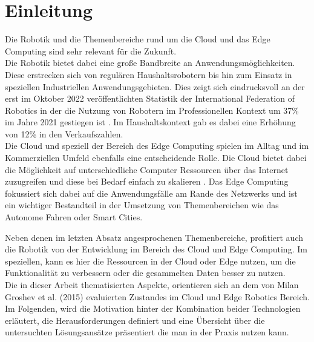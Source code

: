 \section{Einleitung}
\label{sec:Einleitung}

Die Robotik und die Themenbereiche rund um die Cloud und das Edge Computing sind sehr relevant für die Zukunft.\\
Die Robotik bietet dabei eine große Bandbreite an Anwendungsmöglichkeiten. Diese erstrecken sich von regulären Haushaltsrobotern bis hin zum Einsatz in speziellen Industriellen Anwendungsgebieten. Dies zeigt sich eindrucksvoll an der erst im Oktober 2022 veröffentlichten Statistik der International Federation of Robotics in der die Nutzung von Robotern im Professionellen Kontext um  37\% im Jahre 2021 gestiegen ist \cite{ifrSalesRobotsService2022} . Im Haushaltskontext gab es dabei eine Erhöhung von 12\% in den Verkaufszahlen.\\
Die Cloud und speziell der Bereich des Edge Computing spielen im Alltag und im Kommerziellen Umfeld ebenfalls eine entscheidende Rolle. Die Cloud bietet dabei die Möglichkeit auf unterschiedliche Computer Ressourcen über das Internet zuzugreifen und diese bei Bedarf einfach zu skalieren \cite{mellNISTDefinitionCloud} . Das Edge Computing fokussiert sich dabei auf die Anwendungsfälle am Rande des Netzwerks und ist ein wichtiger Bestandteil in der Umsetzung von Themenbereichen wie das Autonome Fahren oder Smart Cities.

Neben denen im letzten Absatz angesprochenen Themenbereiche, profitiert auch die Robotik von der Entwicklung im Bereich des Cloud und Edge Computing. Im speziellen, kann es hier die Ressourcen in der Cloud oder Edge nutzen, um die Funktionalität zu verbessern oder die gesammelten Daten besser zu nutzen.\\
Die in dieser Arbeit thematisierten Aspekte, orientieren sich an dem von Milan Groshev et al. (2015) \cite{groshevEdgeRoboticsAre2022} evaluierten Zustandes im Cloud und Edge Robotics Bereich. Im Folgenden, wird die Motivation hinter der Kombination beider Technologien erläutert, die Herausforderungen definiert und eine Übersicht über die untersuchten Lösungsansätze präsentiert die man in der Praxis nutzen kann.




